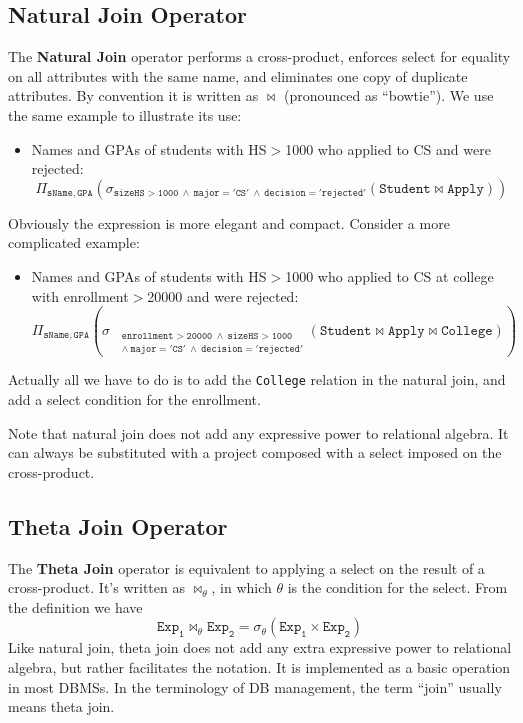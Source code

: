\subsection{Natural Join Operator}
The \textbf{Natural Join} operator performs a cross-product, enforces select for equality on all attributes with the same name, and eliminates one copy of duplicate attributes. By convention it is written as $\bowtie$ (pronounced as ``bowtie''). We use the same example to illustrate its use:
\begin{itemize}
\item Names and GPAs of students with HS$>$1000 who applied to CS and were rejected:
\begin{equation*}
\mathtt{\Pi_{sName,GPA}\left(\sigma_{sizeHS>1000\:\land\:major='CS'\:\land\:decision='rejected'}\left(Student\bowtie Apply\right)\right)}
\end{equation*}
\end{itemize}
Obviously the expression is more elegant and compact. Consider a more complicated example:
\begin{itemize}
\item Names and GPAs of students with HS$>$1000 who applied to CS at college with enrollment$>$20000 and were rejected:
\begin{equation*}
\mathtt{\Pi_{sName,GPA}\left(\sigma_{
\begin{aligned}
&\mathtt{\scriptstyle enrollment>20000\:\land\:sizeHS>1000}\\
&\mathtt{\scriptstyle\land\:major='CS'\:\land\:decision='rejected'}
\end{aligned}
}\left(Student\bowtie Apply\bowtie College\right)\right)}
\end{equation*}
\end{itemize}
Actually all we have to do is to add the \texttt{College} relation in the natural join, and add a select condition for the enrollment.

Note that natural join does not add any expressive power to relational algebra. It can always be substituted with a project composed with a select imposed on the cross-product.
\subsection{Theta Join Operator}
The \textbf{Theta Join} operator is equivalent to applying a select on the result of a cross-product. It's written as $\bowtie_{\theta}$, in which $\theta$ is the condition for the select. From the definition we have 
\begin{equation*}
\mathtt{Exp_1\bowtie_{\theta}Exp_2 = \sigma_{\theta}(Exp_1\times Exp_2)}
\end{equation*}
Like natural join, theta join does not add any extra expressive power to relational algebra, but rather facilitates the notation. It is implemented as a basic operation in most DBMSs. In the terminology of DB management, the term ``join'' usually means theta join. 

